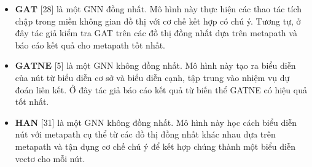 \begin{itemize}
  \item $\mathbf{GAT}$ [28] là một GNN đồng nhất. Mô hình này thực hiện các thao tác tích chập trong miền không gian đồ thị với cơ chế kết hợp có chú ý. Tương tự, ở đây tác giả kiểm tra GAT trên các đồ thị đồng nhất dựa trên metapath và báo cáo kết quả cho metapath tốt nhất.
  \item $\mathbf{GATNE}$ [5] là một GNN không đồng nhất. Mô hình này tạo ra biểu diễn của nút từ biểu diễn cơ sở và biểu diễn cạnh, tập trung vào nhiệm vụ dự đoán liên kết. Ở đây tác giả báo cáo kết quả từ biến thể GATNE có hiệu quả tốt nhất.
  \item $\mathbf{HAN}$ [31] là một GNN không đồng nhất. Mô hình này học cách biểu diễn nút với metapath cụ thể từ các đồ thị đồng nhất khác nhau dựa trên metapath và tận dụng cơ chế chú ý để kết hợp chúng thành một biểu diễn vectơ cho mỗi nút.
\end{itemize}

